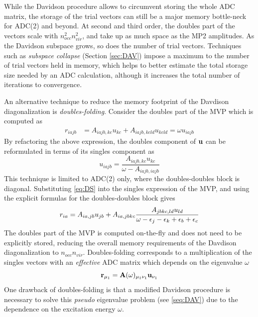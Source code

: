 While the Davidson procedure allows to circumvent storing the whole ADC matrix, the storage of the trial vectors can still be a major memory bottle-neck for ADC(2) and beyond. At second and third order, the doubles part of the vectors scale with $n_{occ}^2n_{vir}^2$, and take up as much space as the MP2 amplitudes. As the Davidson subspace grows, so does the number of trial vectors. Techniques such as \emph{subspace collapse} (Section \ref{sec:DAV}) impose a maximum to the number of trial vectors held in memory, which helps to better estimate the total storage size needed by an ADC calculation, although it increases the total number of iterations to convergence.

An alternative technique to reduce the memory footprint of the Davdison diagonalization is \emph{doubles-folding}. Consider the doubles part of the MVP which is computed as
\begin{align}
r_{iajb} &= A_{iajb,kc} u_{kc} + A_{iajb,kcld} u_{kcld} = \omega u_{iajb}
\end{align}
\noindent By refactoring the above expression, the doubles component of $\mathbf{u}$ can be reformulated in terms of its singles component as
\begin{equation}
u_{iajb} = \frac{A_{iajb,kc} u_{kc}}{\omega - A_{iajb,iajb}} 
\label{eq:DS}
\end{equation}
\noindent This technique is limited to ADC(2) only, where the doubles-doubles block is diagonal. Substituting \ref{eq:DS} into the singles expression of the MVP, and using the explicit formulas for the doubles-doubles block gives
\begin{equation}
r_{ia} = A_{ia,jb} u_{jb} + A_{ia,jbkc} \frac{A_{jbkc,ld} u_{ld}}{\omega - \epsilon_j - \epsilon_k + \epsilon_b + \epsilon_c} 
\end{equation}
\noindent The doubles part of the MVP is computed on-the-fly and does not need to be explicitly stored, reducing the overall memory requirements of the Davdison diagonalization to $n_{occ}n_{vir}$. Doubles-folding corresponds to a multiplication of the singles vectors with an \emph{effective} ADC matrix which depends on the eigenvalue $\omega$
\begin{equation}
\mathbf{r}_{\mu_1} = \mathbf{A}(\omega)_{\mu_1\nu_1} \mathbf{u}_{\nu_1} 
\end{equation}
\noindent One drawback of doubles-folding is that a modified Davidson procedure is necessary to solve this \emph{pseudo} eigenvalue problem (see \ref{seq:DAV}) due to the dependence on the excitation energy $\omega$.

